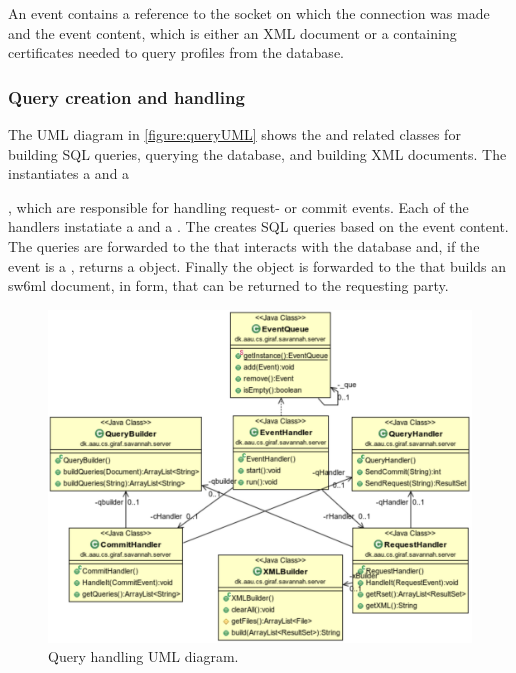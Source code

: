 An event contains a reference to the socket on which the connection was made and the event content, which is either an XML document or a  containing certificates
needed to query profiles from the database.

\subsubsection{Query creation and handling}

The UML diagram in \autoref{figure:queryUML} shows the  and related classes for building SQL queries, querying the database, and building XML documents.
The  instantiates a  and a 

\noindent {}, which are responsible for handling request- or commit events.
Each of the handlers instatiate a  and a . The  creates SQL queries based on the event content. The queries are forwarded to the 
that interacts with the database and, if the event is a , returns a  object. Finally the  object is forwarded to the  that builds an sw6ml document,
in  form, that can be returned to the requesting party. 
\begin{figure}[H]
 \centering
  \includegraphics[width=1.00\textwidth]{images/queryhandling}
  \caption{Query handling UML diagram.}
  \label{figure:queryUML}
\end{figure}

